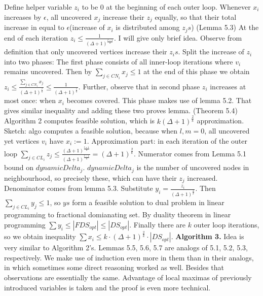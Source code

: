\documentclass{article}
\begin{document}
\newline Define helper variable $z_i$ to be $0$ at the beginning of each outer loop. Whenever $x_i$ increases by $\epsilon$, all uncovered $x_j$ increase their $z_j$ equally, so that their total increase in equal to $\epsilon$(increase of $x_i$ is distributed among $z_js$) (Lemma 5.3) At the end of each iteration $z_i \leq \frac{1}{(\Delta + 1)^\frac{l-1}{k}}$. I will give only brief idea. Observe from definition that only uncovered vertices increase their $z_is$. Split the increase of $z_i$ into two phases: The first phase consists of all inner-loop iterations where $v_i$ remains uncovered. Then by $\sum_{j\in CN_i} x_j \leq 1$ at the end of this phase we obtain $z_i \leq \frac{\sum_{j\in CN_i} x_j}{(\Delta + 1)^{\frac{l}{k}}} \leq \frac{1}{(\Delta + 1)^{\frac{l}{k}}}$. Further, observe that in second phase $z_i$ increases at most once: when $x_i$ becomes covered. This phase makes use of lemma 5.2. That gives similar inequality and adding these two proves lemma. 
\newline (Theorem 5.4) Algorithm 2 computes feasible solution, which is $k(\Delta + 1)^{\frac{2}{k}}$ approximation. Sketch: algo computes a feasible solution, because when $l, m = 0$, all uncovered yet vertices $v_i$ have $x_i := 1$. Approximation part: in each iteration of the outer loop $\sum_{j\in CL_i} z_j \leq \frac{(\Delta + 1)^\frac{l+1}{k}}{(\Delta + 1)^\frac{l-1}{k}} = (\Delta + 1)^\frac{2}{k}$. Numerator comes from Lemma 5.1 bound on $dynamicDelta_j$. $dynamicDelta_j$ is the number of uncovered nodes in neighbourhood, so precisely these, which can have their $z_j$ increased. Denominator comes from lemma 5.3. Substitute $y_i = \frac{z_i}{(\Delta + 1)^\frac{2}{k}}$. Then $\sum_{j\in CL_i} y_j \leq 1$, so $ys$ form a feasible solution to dual problem in linear programming to fractional domianating set. By duality theorem in linear programming $\sum y_i \leq |FDS_{opt}| \leq |DS_{opt}|$. Finally there are $k$ outer loop iterations, so we obtain inequality $\sum x_i \leq k\cdot (\Delta + 1)^\frac{2}{k} \cdot |DS_{opt}|$.
\newline \textbf{Algorithm 3.} Idea is very similar to Algorithm 2's. Lemmas 5.5, 5.6, 5.7 are analogs of 5.1, 5.2, 5.3, respectively. We make use of induction even more in them than in their analogs, in which sometimes some direct reasoning worked as well. Besides that observations are essentially the same. Advantage of local maximas of previously introduced variables is taken and the proof is even more technical. 
\end{document}
